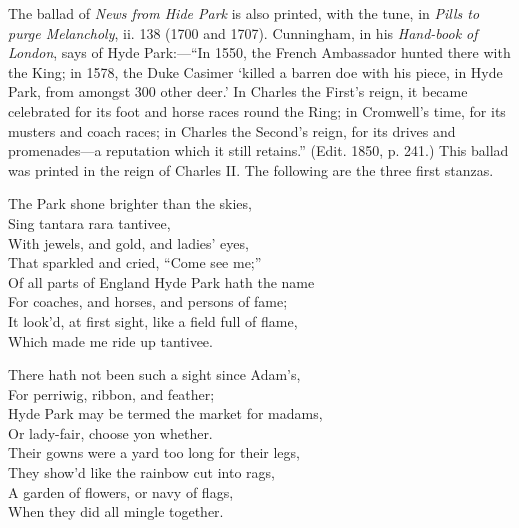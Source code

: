 \pagebreak

The ballad of \textit{News from Hide Park} is also printed, with the tune, in \textit{Pills to
purge Melancholy}, ii. 138 (1700 and 1707). Cunningham, in his \textit{Hand-book of
London}, says of Hyde Park:—“In 1550, the French Ambassador hunted there
with the King; in 1578, the Duke Casimer ‘killed a barren doe with his piece,
in Hyde Park, from amongst 300 other deer.’ In Charles the First’s reign, it
became celebrated for its foot and horse races round the Ring; in Cromwell’s
time, for its musters and coach races; in Charles the Second’s reign, for its drives
and promenades—a reputation which it still retains.” (Edit. 1850, p. 241.)
This ballad was printed in the reign of Charles II. The following are the three
first stanzas.



\settowidth{\versewidth}{The Park shone brighter than the skies,}
\begin{dcverse}\begin{patverse}
The Park shone brighter than the skies,\\
Sing tantara rara tantivee,\\
With jewels, and gold, and ladies’ eyes,\\
That sparkled and cried, “Come see me;”\\
Of all parts of England Hyde Park hath the name\\
For coaches, and horses, and persons of fame;\\
It look’d, at first sight, like a field full of flame,\\
Which made me ride up tantivee.
\end{patverse}

\begin{patverse}
There hath not been such a sight since Adam’s,\\
For perriwig, ribbon, and feather;\\
Hyde Park may be termed the market for madams,\\
Or lady-fair, choose yon whether. \\
Their gowns were a yard too long for their legs,\\
They show’d like the rainbow cut into rags,\\
A garden of flowers, or navy of flags,\\
When they did all mingle together.
\end{patverse}
\end{dcverse}

